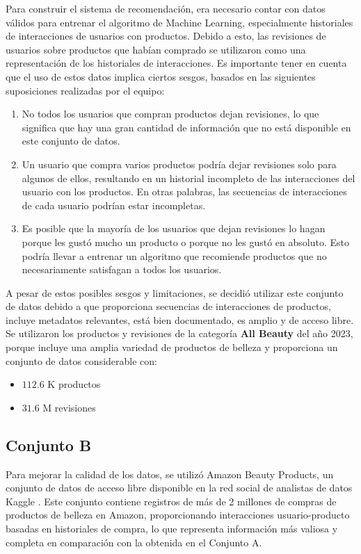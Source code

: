 \documentclass[runningheads]{llncs}
\begin{document}
Para construir el sistema de recomendación, era necesario contar con datos válidos para entrenar el algoritmo de Machine Learning, especialmente historiales de interacciones de usuarios con productos. Debido a esto, las revisiones de usuarios sobre productos que habían comprado se utilizaron como una representación de los historiales de interacciones. Es importante tener en cuenta que el uso de estos datos implica ciertos sesgos, basados en las siguientes suposiciones realizadas por el equipo:
\begin{enumerate}
	\item No todos los usuarios que compran productos dejan revisiones, lo que significa que hay una gran cantidad de información que no está disponible en este conjunto de datos.
	\item Un usuario que compra varios productos podría dejar revisiones solo para algunos de ellos, resultando en un historial incompleto de las interacciones del usuario con los productos. En otras palabras, las secuencias de interacciones de cada usuario podrían estar incompletas.
	\item Es posible que la mayoría de los usuarios que dejan revisiones lo hagan porque les gustó mucho un producto o porque no les gustó en absoluto. Esto podría llevar a entrenar un algoritmo que recomiende productos que no necesariamente satisfagan a todos los usuarios.
\end{enumerate}

A pesar de estos posibles sesgos y limitaciones, se decidió utilizar este conjunto de datos debido a que proporciona secuencias de interacciones de productos, incluye metadatos relevantes, está bien documentado, es amplio y de acceso libre. Se utilizaron los productos y revisiones de la categoría \textbf{All Beauty} del año 2023, porque incluye una amplia variedad de productos de belleza y proporciona un conjunto de datos considerable con:
\begin{itemize}
	\item $112.6$ K productos
	\item $31.6$ M revisiones
\end{itemize}

\subsection{Conjunto B}

Para mejorar la calidad de los datos, se utilizó Amazon Beauty Products, un conjunto de datos de acceso libre disponible en la red social de analistas de datos Kaggle . Este conjunto contiene registros de más de 2 millones de compras de productos de belleza en Amazon, proporcionando interacciones usuario-producto basadas en historiales de compra, lo que representa información más valiosa y completa en comparación con la obtenida en el Conjunto A.
\end{document}

